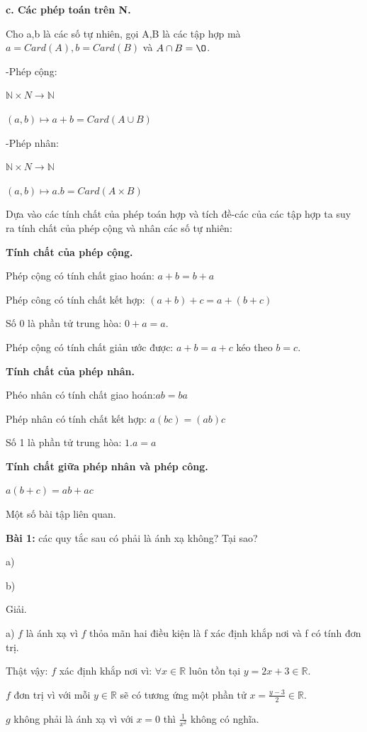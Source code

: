\documentclass[12pt,oneside,a4paper,reqno]{book}
\begin{document}
\textbf{c. Các phép toán trên N.}

Cho a,b là các số tự nhiên, gọi A,B là các tập hợp mà $a=Card(A), b=Card(B)$  và $A \cap B= \O $.

-Phép cộng:

$\mathbb{N}\times N\to \mathbb{N}$

$(a,b)\mapsto a+b=Card(A\cup B)$
   
-Phép nhân:

$\mathbb{N}\times N\to \mathbb{N}$

$(a,b)\mapsto a.b=Card(A\times B)$
   
Dựa vào các tính chất của phép toán hợp và tích đề-các của các tập hợp ta suy ra tính chất của phép cộng và nhân các số tự nhiên:

\textbf{Tính chất của phép cộng.}

Phép cộng có tính chất giao hoán: $a+b=b+a$

Phép công có tính chất kết hợp: $(a+b)+c=a+(b+c)$

Số 0 là phần tử trung hòa: $0+a=a.$

Phép cộng có tính chất giản ước được: $a+b=a+c$ kéo theo $b=c.$

\textbf{Tính chất của phép nhân.}

Phéo nhân có tính chất giao hoán:$ab=ba$

Phép nhân có tính chất kết hợp: $a(bc)=(ab)c$

Số 1 là phần tử trung hòa: $1.a=a$

\textbf{Tính chất giữa phép nhân và phép công.}

$a(b+c)=ab+ac$

Một số bài tập liên quan.

\textbf{Bài 1:} các quy tắc sau có phải là ánh xạ không? Tại sao?

a) 

b) 

Giải.

a) $f$ là ánh xạ vì $f$ thỏa mãn hai điều kiện là f xác định khắp nơi và f có tính đơn trị.

Thật vậy:
$f$  xác định khắp nơi vì: $\forall x\in \mathbb{R}$ luôn tồn tại $y=2x+3\in \mathbb{R}.$

$f$ đơn trị vì với mỗi $y\in \mathbb{R}$ sẽ có tương ứng một phần tử $x=\frac{y-3}{2}\in \mathbb{R}$.

$g$ không phải là ánh xạ vì với $x=0$ thì  $\frac{1}{x^2}$   không có nghĩa.
\end{document}
